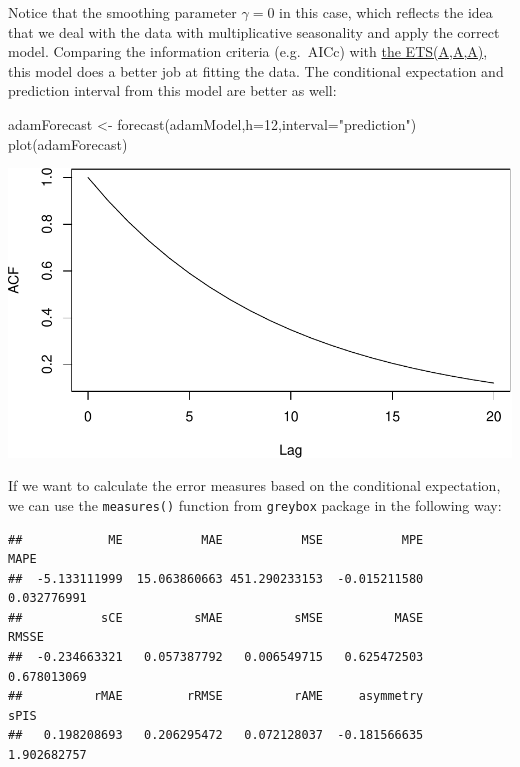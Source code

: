 \documentclass[
]{book}
\newenvironment{Shaded}{\begin{snugshade}}{\end{snugshade}}
\newcommand{\AttributeTok}[1]{\textcolor[rgb]{0.77,0.63,0.00}{#1}}
\newcommand{\DecValTok}[1]{\textcolor[rgb]{0.00,0.00,0.81}{#1}}
\newcommand{\FunctionTok}[1]{\textcolor[rgb]{0.00,0.00,0.00}{#1}}
\newcommand{\NormalTok}[1]{#1}
\newcommand{\OtherTok}[1]{\textcolor[rgb]{0.56,0.35,0.01}{#1}}
\newcommand{\SpecialCharTok}[1]{\textcolor[rgb]{0.00,0.00,0.00}{#1}}
\newcommand{\StringTok}[1]{\textcolor[rgb]{0.31,0.60,0.02}{#1}}
\theoremstyle{definition}
\theoremstyle{definition}
\theoremstyle{definition}
\theoremstyle{definition}
\theoremstyle{remark}
\begin{document}
Notice that the smoothing parameter \(\gamma=0\) in this case, which reflects the idea that we deal with the data with multiplicative seasonality and apply the correct model. Comparing the information criteria (e.g.~AICc) with \protect\hyperlink{ADAMETSPureAdditiveExamplesETSAAA}{the ETS(A,A,A)}, this model does a better job at fitting the data. The conditional expectation and prediction interval from this model are better as well:

\begin{Shaded}
\begin{Highlighting}[]
\NormalTok{adamForecast }\OtherTok{\textless{}{-}} \FunctionTok{forecast}\NormalTok{(adamModel,}\AttributeTok{h=}\DecValTok{12}\NormalTok{,}\AttributeTok{interval=}\StringTok{"prediction"}\NormalTok{)}
\FunctionTok{plot}\NormalTok{(adamForecast)}
\end{Highlighting}
\end{Shaded}

\includegraphics{adam_files/figure-latex/unnamed-chunk-46-1.pdf}

If we want to calculate the error measures based on the conditional expectation, we can use the \texttt{measures()} function from \texttt{greybox} package in the following way:

\begin{Shaded}
\end{Shaded}

\begin{verbatim}
##            ME           MAE           MSE           MPE          MAPE 
##  -5.133111999  15.063860663 451.290233153  -0.015211580   0.032776991 
##           sCE          sMAE          sMSE          MASE         RMSSE 
##  -0.234663321   0.057387792   0.006549715   0.625472503   0.678013069 
##          rMAE         rRMSE          rAME     asymmetry          sPIS 
##   0.198208693   0.206295472   0.072128037  -0.181566635   1.902682757
\end{verbatim}
\end{document}

